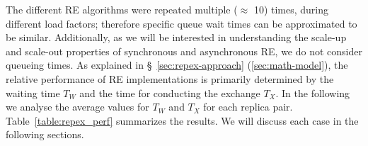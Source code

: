\documentclass{rspublic}
\newcommand{\jhanote}[1]{ {\textcolor{red} { ***shantenu: #1 }}}
\newcommand{\athotanote}[1]{ {\textcolor{green} { ***athota: #1 }}}
\newcommand{\athotanote}[1]{}
\newcommand{\jhanote}[1]{}
\begin{document}

The different RE algorithms were repeated multiple ($\approx$ 10)
times, during different load factors; therefore specific queue wait
times can be approximated to be similar.  Additionally, as we will
be interested in understanding the scale-up and scale-out properties
of synchronous and asynchronous RE, we do not consider queueing times.
As explained in \S~\ref{sec:repex-approach} (\ref{sec:math-model}),
the relative performance of RE implementations is primarily determined
by the waiting time $T_W$ and the time for conducting the exchange
$T_X$. In the following we analyse the average values for $T_{W}$ and
$T_X$ for each replica pair.  Table~\ref{table:repex_perf} summarizes
the results. We will discuss each case in the following sections.



\end{document}
